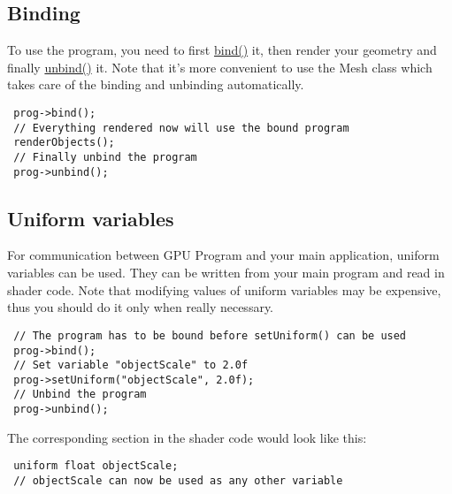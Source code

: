 \hypertarget{class_k_g_l_program_binding}{}\subsection{Binding}\label{class_k_g_l_program_binding}
To use the program, you need to first \hyperlink{class_k_g_l_program_48756f0c04a768d2fef06d7ac3d29207}{bind()} it, then render your geometry and finally \hyperlink{class_k_g_l_program_a52890b41224848903a772049f374dc3}{unbind()} it. Note that it's more convenient to use the Mesh class which takes care of the binding and unbinding automatically. 

\begin{Code}\begin{verbatim} prog->bind();
 // Everything rendered now will use the bound program
 renderObjects();
 // Finally unbind the program
 prog->unbind();
\end{verbatim}
\end{Code}

\hypertarget{class_k_g_l_program_uniforms}{}\subsection{Uniform variables}\label{class_k_g_l_program_uniforms}
For communication between GPU Program and your main application, uniform variables can be used. They can be written from your main program and read in shader code. Note that modifying values of uniform variables may be expensive, thus you should do it only when really necessary. 

\begin{Code}\begin{verbatim} // The program has to be bound before setUniform() can be used
 prog->bind();
 // Set variable "objectScale" to 2.0f
 prog->setUniform("objectScale", 2.0f);
 // Unbind the program
 prog->unbind();
\end{verbatim}
\end{Code}



The corresponding section in the shader code would look like this: 

\begin{Code}\begin{verbatim} uniform float objectScale;
 // objectScale can now be used as any other variable
\end{verbatim}
\end{Code}



